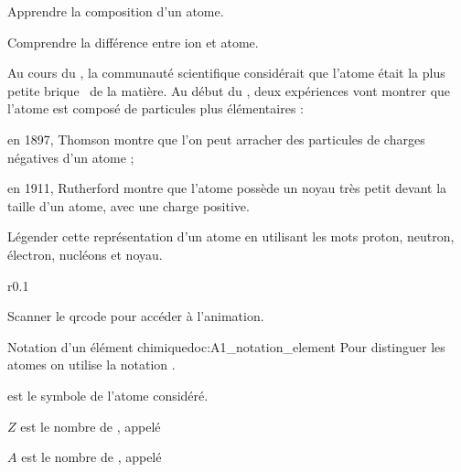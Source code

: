 \teteSndAtom



\begin{objectifs}
  \item Apprendre la composition d'un atome.
  \item Comprendre la différence entre ion et atome.
\end{objectifs}

\begin{contexte}
  Au cours du , la communauté scientifique considérait que l'atome était la plus petite \og brique \fg\, de la matière.
  Au début du , deux expériences vont montrer que l'atome est composé de particules plus élémentaires :
  \begin{listePoints}
    \item en 1897, Thomson montre que l'on peut arracher des particules de charges négatives d'un atome ;
    \item en 1911, Rutherford montre que l'atome possède un noyau très petit devant la taille d'un atome, avec une charge positive.
  \end{listePoints}
  
\end{contexte}



\numeroQuestion
Légender cette représentation d'un atome en utilisant les mots proton, neutron, électron, nucléons et noyau.

\begin{center}
\end{center}

\begin{wrapfigure}[1]{r}{0.1\linewidth}
  \vspace*{-60pt}
\end{wrapfigure}

\mesure Scanner le qrcode pour accéder à l'animation.


\begin{doc}{Notation d'un élément chimique}{doc:A1_notation_element}
  Pour distinguer les atomes on utilise la notation .
  \begin{importants}
    \begin{listePoints}
      \item {} est le symbole de l'atome considéré.
      \item $Z$ est le nombre de , appelé 
      \item $A$ est le nombre de , appelé 
    \end{listePoints}
  \end{importants}
\end{doc}

